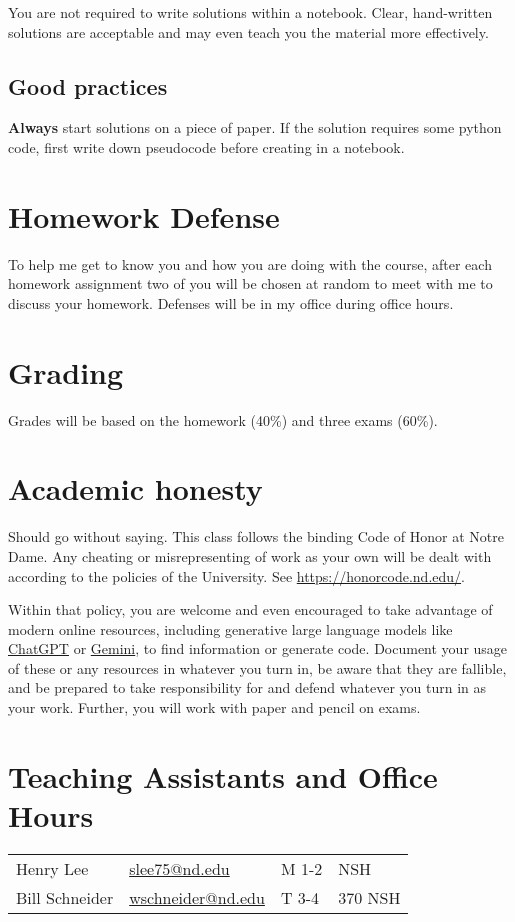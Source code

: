 \documentclass[11pt]{article}
\begin{document}
You are not required to write solutions within a notebook. Clear, hand-written solutions are acceptable and may even teach you the material more effectively.
\subsection{Good practices}
\label{sec:orgb8e0958}
\textbf{Always} start solutions on a piece of paper. If the solution requires some python code, first write down pseudocode before creating in a notebook. 
\section{Homework Defense}
\label{sec:org3e41d9e}
To help me get to know you and how you are doing with the course, after each homework assignment two of you will be chosen at random to meet with me to discuss your homework. Defenses will be in my office during office hours.
\section{Grading}
\label{sec:org763f292}
Grades will be based on the homework (40\%) and three exams (60\%).
\section{Academic honesty}
\label{sec:org1b335fc}
Should go without saying. This class follows the binding Code of Honor at Notre Dame.  Any cheating or misrepresenting of work as your own will be dealt with according to the policies of the University.  See \url{https://honorcode.nd.edu/}.

Within that policy, you are welcome and even encouraged to take advantage of modern online resources, including generative large language models like \href{https://chatgpt.comm}{ChatGPT} or \href{https://gemini.google.com/app}{Gemini}, to find information or generate code. Document your usage of these or any resources in whatever you turn in, be aware that they are fallible, and be prepared to take responsibility for and defend whatever you turn in as your work. Further, you will work with paper and pencil on exams.
\section{Teaching Assistants and Office Hours}
\label{sec:orgfb771c3}

\begin{center}
\begin{tabular}{llll}
Henry Lee & \href{mailto:slee75@nd.edu}{slee75@nd.edu} & M 1-2 & NSH\\
Bill Schneider & \href{mailto:wschneider@nd.edu}{wschneider@nd.edu} & T 3-4 & 370 NSH\\
\end{tabular}
\end{center}
\end{document}
